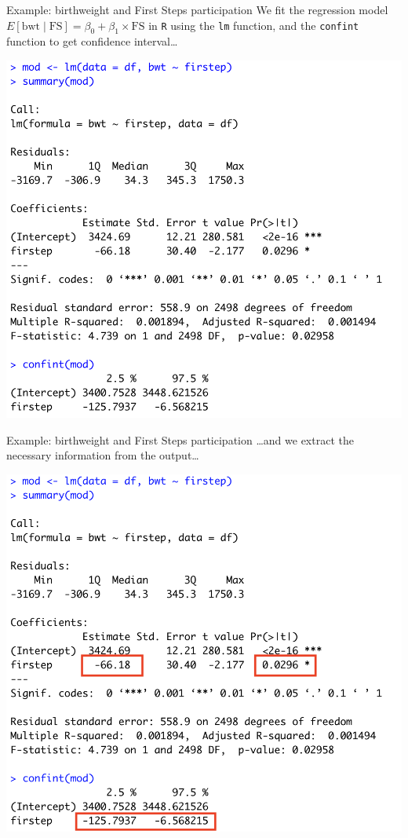 \documentclass[10pt,t]{beamer}
\begin{document}
\begin{frame}{Example: birthweight and First Steps participation}
We fit the regression model $E[\text{bwt} \mid \text{FS}] = \beta_0 + \beta_1 \times \text{FS}$ in \texttt{R} using the \texttt{lm} function, and the \texttt{confint} function to get confidence interval\dots

\vspace{0.2cm}

\centering \includegraphics[scale=0.35]{lm_bwt_fs.png}
\end{frame}

\begin{frame}{Example: birthweight and First Steps participation}
\dots and we extract the necessary information from the output\dots

\vspace{0.2cm}

\centering \includegraphics[scale=0.35]{lm_bwt_fs2.png}
\end{frame}
\end{document}
